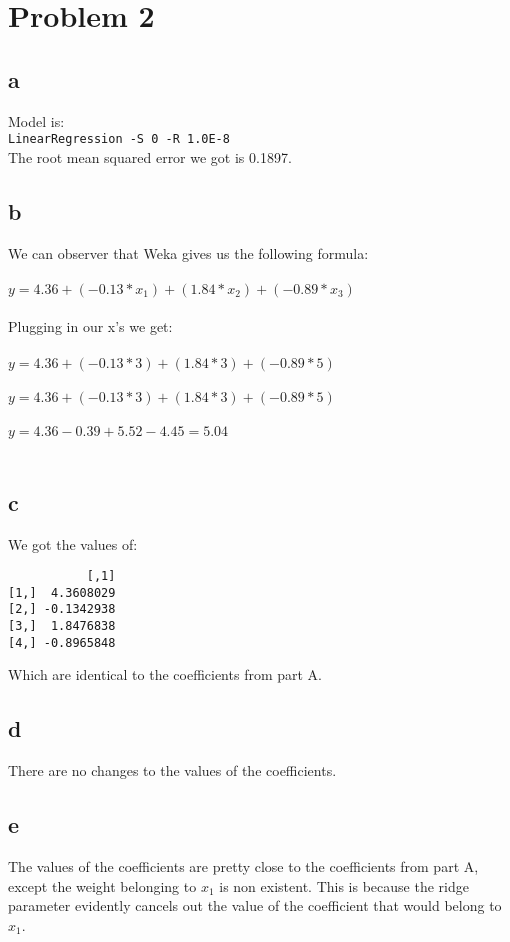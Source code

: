 \documentclass{article}
\begin{document}
\section*{Problem 2}
\subsection*{a}
Model is:\\
\verb|LinearRegression -S 0 -R 1.0E-8|\\
The root mean squared error we got is 0.1897.\\
\subsection*{b}
We can observer that Weka gives us the following formula:\\\\
$y = 4.36 + (-0.13*x_{1}) + (1.84*x_{2}) + (-0.89*x_{3})$\\\\
Plugging in our x's we get:\\\\
$y = 4.36 + (-0.13*3) + (1.84*3) + (-0.89*5)$\\\\
$y = 4.36 + (-0.13*3) + (1.84*3) + (-0.89*5)$\\\\
$y = 4.36 - 0.39 + 5.52 - 4.45 = 5.04$\\\\
\subsection*{c}
We got the values of:\\
\begin{verbatim}
           [,1]
[1,]  4.3608029
[2,] -0.1342938
[3,]  1.8476838
[4,] -0.8965848
\end{verbatim}
Which are identical to the coefficients from part A.\\
\subsection*{d}
There are no changes to the values of the coefficients.\\

\subsection*{e}
The values of the coefficients are pretty close to the coefficients from part A, except the weight belonging to $x_{1}$ is non existent. This is because the ridge parameter evidently cancels out the value of the coefficient that would belong to $x_{1}$.\\
\end{document}
